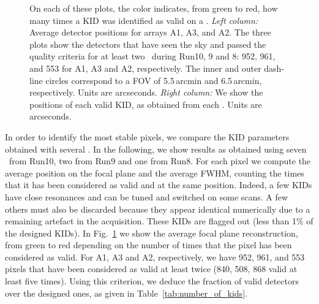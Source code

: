 \begin{figure}[p]
\begin{center}
\caption[KID selection and stability of position in the FOV]{On each of these
  plots, the color indicates, from green to red, how many times a KID was
  identified as valid on a \bm. \emph{Left column:} Average detector positions
  for arrays A1, A3, and A2. The three plots show the detectors that have seen
  the sky and passed the quality criteria for at least two \bms\ during Run10, 9
  and 8: 952, 961, and 553 for A1, A3 and A2, respectively. The inner and outer
  dash-line circles correspond to a FOV of 5.5\,arcmin and 6.5\,arcmin,
  respectively. Units are arcseconds. \emph{Right column:} We show the
  positions of each valid KID, as obtained from each \bm.  Units are arcseconds.}
\label{fig:avg_fov_color}
\end{center}
\end{figure}

In order to identify the most stable pixels, we compare the KID parameters
obtained with several \bms.  In the following, we show results as obtained using
seven \bms\ from Run10, two from Run9 and one from Run8.  For each pixel we
compute the average position on the focal plane and the average FWHM, counting
the times that it has been considered as valid and at the same position. Indeed,
a few KIDs have close resonances and can be tuned and switched on some scans. A
few others must also be discarded because they appear identical numerically due
to a remaining artefact in the acquisition. These KIDs are flagged out (less
than 1\% of the designed KIDs). In Fig.~\ref{fig:avg_fov_color} we show the
average focal plane reconstruction, from green to red depending on the number of
times that the pixel has been considered as valid. For A1, A3 and A2,
respectively, we have 952, 961, and 553 pixels that have been considered as
valid at least twice (840, 508, 868 valid at least five times). Using this
criterion, we deduce the fraction of valid detectors over the designed ones, as
given in Table~\ref{tab:number_of_kids}.


